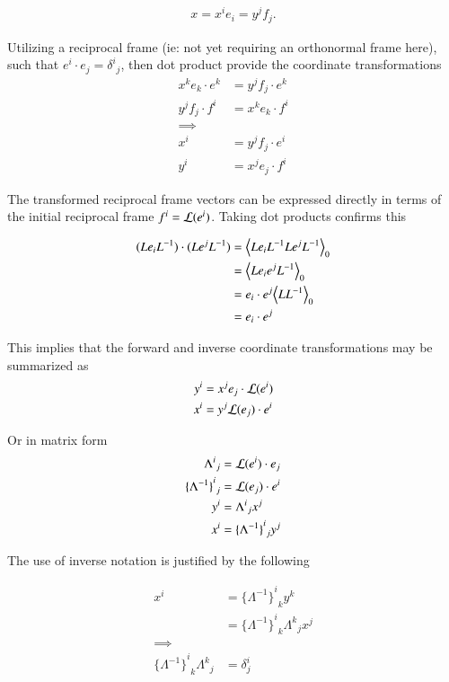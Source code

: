 \documentclass{article}
\newcommand{\Lor}[2]{{{\Lambda^{#1}}_{#2}}}
\newcommand{\ILor}[2]{{{ \{{\Lambda^{-1}\} }^{#1}}_{#2}}}
\begin{document}
\begin{align*}
x = x^i e_i = y^j f_j.
\end{align*}

Utilizing a reciprocal frame (ie: not yet requiring an orthonormal frame here), such that $e^i \cdot e_j = {\delta^i}_j$, 
then dot product provide the coordinate transformations
\begin{align*}
x^k e_k \cdot e^k &= y^j f_j \cdot e^k \\
y^j f_j \cdot f^i &= x^k e_k \cdot f^i \\
\implies \\
x^i &= y^j f_j \cdot e^i \\
y^i &= x^j e_j \cdot f^i
\end{align*}

The transformed reciprocal frame vectors can be expressed directly in terms of the initial reciprocal frame $f^i = \mathcal{L}(e^i)$.  Taking
dot products confirms this

\begin{align*}
(L e_i L^{-1}) \cdot (L e^j L^{-1}) 
&= {\left\langle{{ L e_i L^{-1} L e^j L^{-1} }}\right\rangle}_{0} \\
&= {\left\langle{{ L e_i e^j L^{-1} }}\right\rangle}_{0} \\
&= e_i \cdot e^j {\left\langle{{ L L^{-1} }}\right\rangle}_{0} \\
&= e_i \cdot e^j
\end{align*}

This implies that the forward and inverse coordinate transformations may be summarized as
\begin{align*}
y^i &= x^j e_j \cdot \mathcal{L}(e^i) \\
x^i &= y^j \mathcal{L}(e_j) \cdot e^i \\
\end{align*}

Or in matrix form
\begin{align}\label{eqn:coordinateTxTensors}
\Lor{i}{j} &= \LL(e^i) \cdot e_j \\
\ILor{i}{j} &= \LL(e_j) \cdot e^i \\
y^i &= \Lor{i}{j} x^j \\
x^i &= \ILor{i}{j} y^j
\end{align}


The use of inverse notation is justified by the following

\begin{align*}
x^i &= \ILor{i}{k} y^k \\
&= \ILor{i}{k} \Lor{k}{j} x^j \\
\implies \\
\ILor{i}{k} \Lor{k}{j} &= \delta^i_j
\end{align*}
\end{document}
